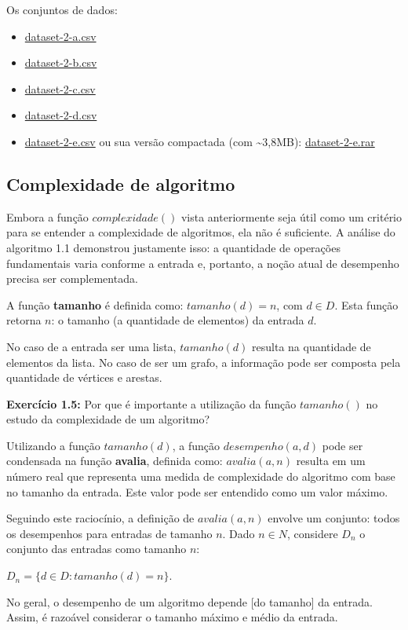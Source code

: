 \documentclass{article}
\begin{document}
Os conjuntos de dados:

\begin{itemize}
\itemsep1pt\parskip0pt
\item
  \url{dataset-2-a.csv}
\item
  \url{dataset-2-b.csv}
\item
  \url{dataset-2-c.csv}
\item
  \url{dataset-2-d.csv}
\item
  \url{dataset-2-e.csv} ou sua versão compactada (com
  \textasciitilde{}3,8MB): \url{dataset-2-e.rar}
\end{itemize}


    \subsection{Complexidade de algoritmo}


    Embora a função \(complexidade()\) vista anteriormente seja útil como um
critério para se entender a complexidade de algoritmos, ela não é
suficiente. A análise do algoritmo 1.1 demonstrou justamente isso: a
quantidade de operações fundamentais varia conforme a entrada e,
portanto, a noção atual de desempenho precisa ser complementada.

A função \textbf{tamanho} é definida como: \(tamanho(d) = n\), com
\(d \in D\). Esta função retorna \(n\): o tamanho (a quantidade de
elementos) da entrada \(d\).

No caso de a entrada ser uma lista, \(tamanho(d)\) resulta na quantidade
de elementos da lista. No caso de ser um grafo, a informação pode ser
composta pela quantidade de vértices e arestas.

\textbf{Exercício 1.5:} Por que é importante a utilização da função
\(tamanho()\) no estudo da complexidade de um algoritmo?

Utilizando a função \(tamanho(d)\), a função \(desempenho(a, d)\) pode
ser condensada na função \textbf{avalia}, definida como:
\(avalia(a, n)\) resulta em um número real que representa uma medida de
complexidade do algoritmo com base no tamanho da entrada. Este valor
pode ser entendido como um valor máximo.

Seguindo este raciocínio, a definição de \(avalia(a, n)\) envolve um
conjunto: todos os desempenhos para entradas de tamanho \(n\). Dado
\(n \in N\), considere \(D_n\) o conjunto das entradas como tamanho
\(n\):

\(D_n = \{ d \in D : tamanho(d) = n\}\).

No geral, o desempenho de um algoritmo depende {[}do tamanho{]} da
entrada. Assim, é razoável considerar o tamanho máximo e médio da
entrada.
\end{document}
